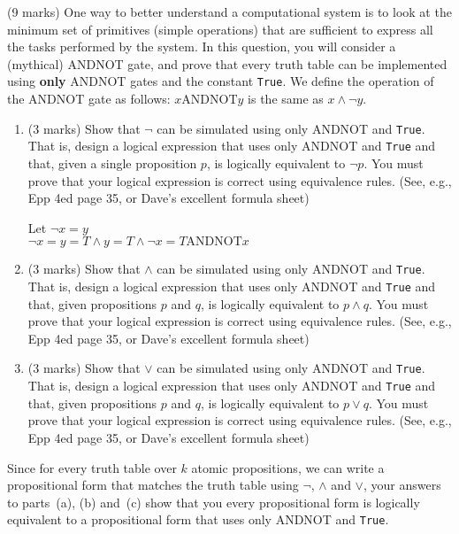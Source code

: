 \item (9 marks) One way to better understand a computational system is to look at the minimum set of primitives (simple operations) that are sufficient to express all the tasks performed by the system. In  this question, you will consider a (mythical)  ANDNOT gate, and prove that every  truth table  can be implemented  using \textbf {only}  ANDNOT gates  and the constant  \texttt  {True}. We  define  the  operation of  the  ANDNOT  gate as  follows: $x \textrm{ANDNOT} y$  is the same as  $x \land \lnot y$.
\begin{enumerate}
\item (3 marks) Show that $\lnot$ can be simulated using only ANDNOT and \texttt {True}. That is, design a logical expression that uses only ANDNOT and \texttt {True} and that, given a single proposition $p$, is logically equivalent to $\lnot p$. You must prove that your logical expression is correct using equivalence rules. (See, e.g., Epp 4ed page 35, or Dave's excellent formula sheet)

Let $\lnot x = y$ \\
$ \lnot x = y = T \land y = T \land\lnot x = T \textrm{ANDNOT} x$

\vspace{4in}
\item (3 marks) Show that $\land$ can be simulated using only ANDNOT and \texttt {True}. That is, design a logical expression that uses only ANDNOT and \texttt {True} and that, given propositions $p$ and $q$, is logically equivalent to $p \land q$. You must prove that your logical expression is correct using equivalence rules. (See, e.g., Epp 4ed page 35, or Dave's excellent formula sheet)



\vspace{4in}
\item (3 marks)  Show that $\lor$ can be simulated using only ANDNOT and \texttt {True}. That is, design a logical expression that uses only ANDNOT and \texttt {True} and that, given propositions $p$ and $q$, is logically equivalent to $p \lor q$. You must prove that your logical expression is correct using equivalence rules. (See, e.g., Epp 4ed page 35, or Dave's excellent formula sheet)
\vspace{4in}
\end{enumerate}
Since for every truth table over $k$ atomic propositions, we can write a propositional form that matches the truth table using $\lnot$, $\land$ and $\lor$, your answers to parts~(a), (b) and~(c) show that you every propositional form is logically equivalent to a propositional form that uses only ANDNOT and \texttt {True}.

